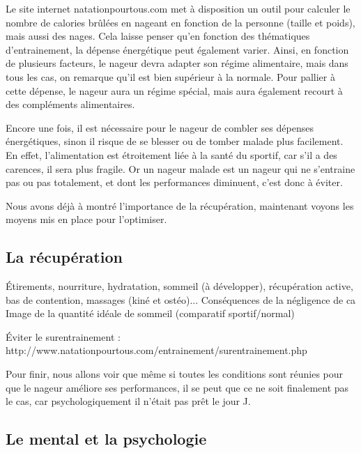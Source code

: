 Le site internet natationpourtous.com met à disposition un outil pour calculer le nombre de calories brûlées en nageant en fonction de la personne (taille et poids), mais aussi des nages. Cela laisse penser qu'en fonction des thématiques d'entrainement, la dépense énergétique peut également varier. Ainsi, en fonction de plusieurs facteurs, le nageur devra adapter son régime alimentaire, mais dans tous les cas, on remarque qu'il est bien supérieur à la normale. Pour pallier à cette dépense, le nageur aura un régime spécial, mais aura également recourt à des compléments alimentaires.

\vspace{12pt}

Encore une fois, il est nécessaire pour le nageur de combler ses dépenses énergétiques, sinon il risque de se blesser ou de tomber malade plus facilement. En effet, l'alimentation est étroitement liée à la santé du sportif, car s'il a des carences, il sera plus fragile. Or un nageur malade est un nageur qui ne s'entraine pas ou pas totalement, et dont les performances diminuent, c'est donc à éviter.

\vspace{12pt}

Nous avons déjà à montré l'importance de la récupération, maintenant voyons les moyens mis en place pour l'optimiser.


\subsection{La récupération}\label{la recup}

Étirements, nourriture, hydratation, sommeil (à développer), récupération active, bas de contention, massages (kiné et ostéo)... Conséquences de la négligence de ca
Image de la quantité idéale de sommeil (comparatif sportif/normal)

Éviter le surentrainement : http://www.natationpourtous.com/entrainement/surentrainement.php

\vspace{12pt}

Pour finir, nous allons voir que même si toutes les conditions sont réunies pour que le nageur améliore ses performances, il se peut que ce ne soit finalement pas le cas, car psychologiquement il n'était pas prêt le jour J.


\subsection{Le mental et la psychologie}

